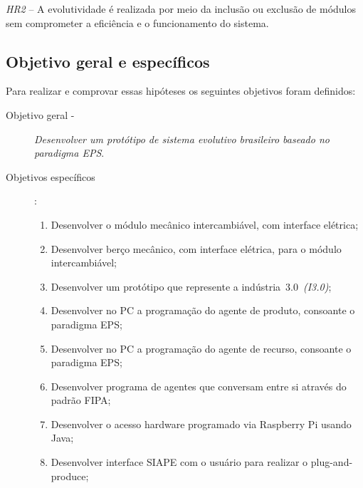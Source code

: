 \emph{HR2} -- A evolutividade é realizada por meio da inclusão ou exclusão de módulos sem comprometer a eficiência e o funcionamento do sistema.


\subsection{Objetivo geral e específicos} 

Para realizar e comprovar essas hipóteses os seguintes objetivos foram definidos:

\begin{description}
	\item[Objetivo geral -] 
	\emph{Desenvolver um protótipo de sistema evolutivo  brasileiro baseado no paradigma \textit{EPS}}.
	
	\item[Objetivos específicos]:\par 
	
	\begin{enumerate}
	
		\item Desenvolver o módulo mecânico intercambiável, com interface elétrica;
		
		\item Desenvolver berço mecânico, com interface elétrica, para o módulo intercambiável;
		
		\item Desenvolver um protótipo que represente a indústria~3.0~\textit{(I3.0)};
		
		\item Desenvolver no PC a programação do agente de produto, consoante o paradigma EPS;
		
		\item Desenvolver no PC a programação do agente de recurso, consoante o paradigma EPS;
		
		\item Desenvolver programa de agentes que conversam entre si através do padrão FIPA;
		
		\item Desenvolver o acesso hardware programado via Raspberry Pi usando Java;
		
		\item Desenvolver interface SIAPE com o usuário para realizar o plug-and-produce; 
	 
	\end{enumerate}
	
\end{description} 



